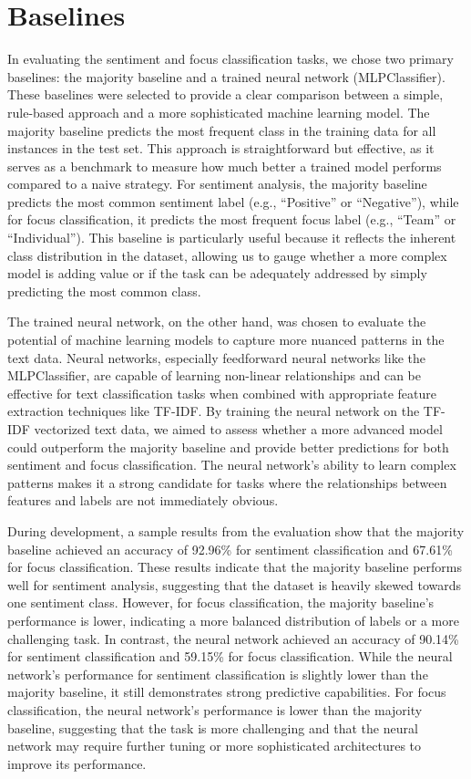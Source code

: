 \documentclass[titlepage]{article}
\begin{document}
\section{Baselines}
In evaluating the sentiment and focus classification tasks, we chose
two primary baselines: the majority baseline and a trained neural
network (MLPClassifier). These baselines were selected to provide a
clear comparison between a simple, rule-based approach and a more
sophisticated machine learning model. The majority baseline predicts
the most frequent class in the training data for all instances in the
test set. This approach is straightforward but effective, as it
serves as a benchmark to measure how much better a trained model
performs compared to a naive strategy. For sentiment analysis, the
majority baseline predicts the most common sentiment label (e.g.,
``Positive'' or ``Negative''), while for focus classification, it
predicts the most frequent focus label (e.g., ``Team'' or
``Individual''). This baseline is particularly useful because it
reflects the inherent class distribution in the dataset, allowing us
to gauge whether a more complex model is adding value or if the task
can be adequately addressed by simply predicting the most common class.

The trained neural network, on the other hand, was chosen to evaluate
the potential of machine learning models to capture more nuanced
patterns in the text data. Neural networks, especially feedforward
neural networks like the MLPClassifier, are capable of learning
non-linear relationships and can be effective for text classification
tasks when combined with appropriate feature extraction techniques
like TF-IDF. By training the neural network on the TF-IDF vectorized
text data, we aimed to assess whether a more advanced model could
outperform the majority baseline and provide better predictions for
both sentiment and focus classification. The neural network's ability
to learn complex patterns makes it a strong candidate for tasks where
the relationships between features and labels are not immediately obvious.

During development, a sample results from the evaluation show that the majority baseline
achieved an accuracy of 92.96\% for sentiment classification and
67.61\% for focus classification. These results indicate that the
majority baseline performs well for sentiment analysis, suggesting
that the dataset is heavily skewed towards one sentiment class.
However, for focus classification, the majority baseline's
performance is lower, indicating a more balanced distribution of
labels or a more challenging task. In contrast, the neural network
achieved an accuracy of 90.14\% for sentiment classification and
59.15\% for focus classification. While the neural network's
performance for sentiment classification is slightly lower than the
majority baseline, it still demonstrates strong predictive
capabilities. For focus classification, the neural network's
performance is lower than the majority baseline, suggesting that the
task is more challenging and that the neural network may require
further tuning or more sophisticated architectures to improve its performance.
\end{document}
